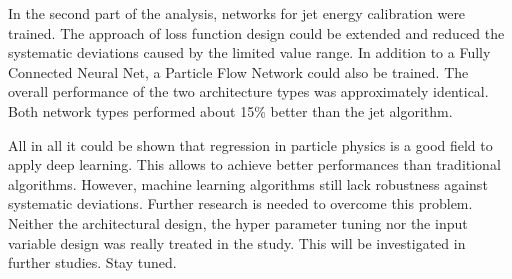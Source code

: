 \documentclass[12pt, a4paper]{thesis}
\begin{document}
In the second part of the analysis, networks for jet energy
calibration were trained.  The approach of loss function design could
be extended and reduced the systematic deviations caused by the
limited value range. In addition to a Fully Connected Neural Net, a
Particle Flow Network could also be trained. The overall performance
of the two architecture types was approximately identical. Both
network types performed about 15\% better than the jet algorithm.

All in all it could be shown that regression in particle physics is a
good field to apply deep learning. This allows to achieve better
performances than traditional algorithms. However, machine learning
algorithms still lack robustness against systematic
deviations. Further research is needed to overcome this
problem. Neither the architectural design, the hyper parameter tuning
nor the input variable design was really treated in the study. This
will be investigated in further studies. Stay tuned.


\appendix
\cleardoublepage



\end{document}
